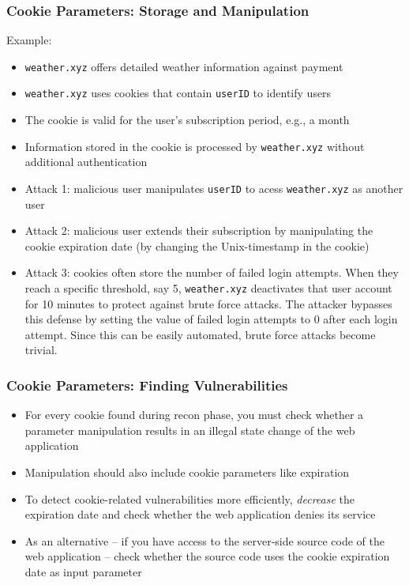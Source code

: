 \begin{frame}
    \frametitle{Cookie Parameters: Storage and Manipulation}
    Example:
    \begin{itemize}
        \item \texttt{weather.xyz} offers detailed weather information against payment
        \item \texttt{weather.xyz} uses cookies that contain \texttt{userID} to identify users
        \item The cookie is valid for the user's subscription period, e.g., a month
        \item Information stored in the cookie is processed by \texttt{weather.xyz} without additional authentication
        \item Attack 1: malicious user manipulates \texttt{userID} to acess \texttt{weather.xyz} as another user
        \item Attack 2: malicious user extends their subscription by manipulating the cookie expiration date (by changing the Unix-timestamp in the cookie)
        \item Attack 3: cookies often store the number of failed login attempts. When they reach a specific threshold, say 5, \texttt{weather.xyz} deactivates that user account for 10 minutes to protect against brute force attacks. The attacker bypasses this defense by setting the value of failed login attempts to 0 after each login attempt. Since this can be easily automated, brute force attacks become trivial.
    \end{itemize}
\end{frame}

\begin{frame}
    \frametitle{Cookie Parameters: Finding Vulnerabilities}
    \begin{itemize}
        \item For every cookie found during recon phase, you must check whether a parameter manipulation results in an illegal state change of the web application
        \item Manipulation should also include cookie parameters like expiration
        \item To detect cookie-related vulnerabilities more efficiently, \textit{decrease} the expiration date and check whether the web application denies its service
        \item As an alternative -- if you have access to the server-side source code of the web application -- check whether the source code uses the cookie expiration date as input parameter
    \end{itemize}
\end{frame}


